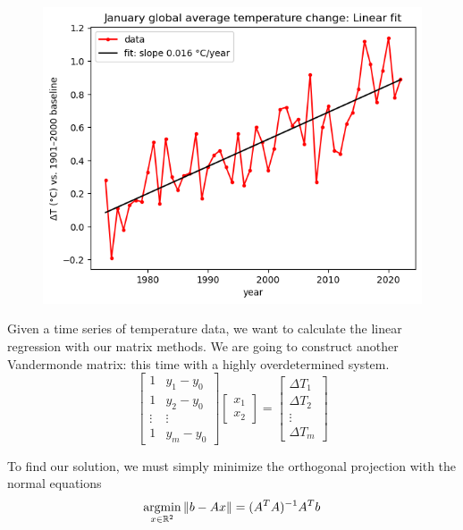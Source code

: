 \documentclass[11pt]{article}
\begin{document}
\begin{examplebox}
		\begin{figure}
		\includegraphics[width=\linewidth]{figs/linreg.png}
    \end{figure}
	\nident Given a time series of temperature data, we want to calculate the linear regression with our matrix methods. We are going to construct another Vandermonde matrix: this time with a highly overdetermined system. 
	$$\begin{bmatrix}
	  1 & y_1 - y_0\\
	1 & y_2 - y_0\\
	\vdots & \vdots\\
	1 & y_m - y_0
	\end{bmatrix}\begin{bmatrix}
	  x_1 \\
	x_2
	\end{bmatrix}
	= \begin{bmatrix}
	  \Delta T_1\\
	\Delta T_2\\
	\vdots\\
	\Delta T_m
	\end{bmatrix}$$

	To find our solution, we must simply minimize the orthogonal projection with the normal equations
	$$\displaystyle \operatorname*{argmin}_{x \in \mathbb{R}^{2}} \|b-Ax\| = (A^{T}A)^{-1}A^{T}b$$
\end{examplebox}
	\vspace{0.5cm}
\end{document}
